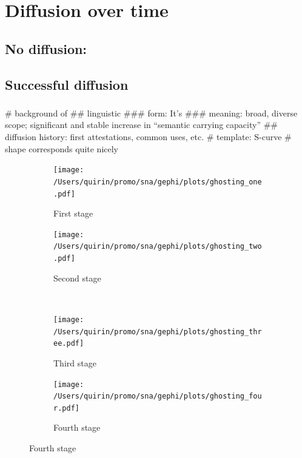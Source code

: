 \documentclass[
  a4paper,
  ]{scrartcl}
\begin{document}
\section{Diffusion over time}

  \subsection{No diffusion: }

  \subsection{Successful diffusion}

    \subsubsection{}

      \begin{easylist}[itemize]
        # background of 
          ## linguistic
            ### form: It's
            ### meaning: broad, diverse scope; significant and stable increase in \enquote{semantic carrying capacity}
          ## diffusion history: first attestations, common uses, etc.
        # template: S-curve
          # shape corresponds quite nicely
      \end{easylist}

      \begin{figure}[H]
        \caption{Social network of diffusion for  over time.}
        \centering
        \begin{subfigure}{.45\linewidth}
          \caption{First stage}
          \centering
          \texttt{[image: /Users/quirin/promo/sna/gephi/plots/ghosting\_one.pdf]}
        \end{subfigure}
        \begin{subfigure}{.45\linewidth}
          \caption{Second stage}
          \centering
          \texttt{[image: /Users/quirin/promo/sna/gephi/plots/ghosting\_two.pdf]}
        \end{subfigure}\\
        \begin{subfigure}{.45\linewidth}
          \caption{Third stage}
          \centering
          \texttt{[image: /Users/quirin/promo/sna/gephi/plots/ghosting\_three.pdf]}
        \end{subfigure}
        \begin{subfigure}{.45\linewidth}
          \caption{Fourth stage}
          \centering
          \texttt{[image: /Users/quirin/promo/sna/gephi/plots/ghosting\_four.pdf]}
        \end{subfigure}
      \end{figure}
\end{document}
